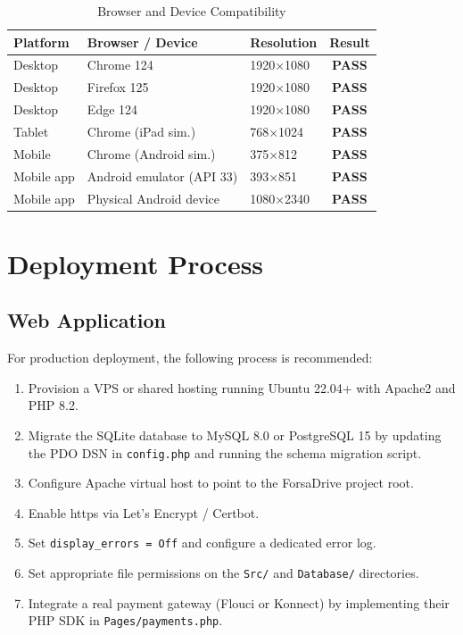 \documentclass[12pt,a4paper,openright]{report}
\begin{document}
\begin{table}[H]
\centering
\caption{Browser and Device Compatibility}
\label{tab:compat}
\begin{tabularx}{\textwidth}{l l l c}
\toprule
\textbf{Platform} & \textbf{Browser / Device} & \textbf{Resolution} & \textbf{Result} \\
\midrule
Desktop & Chrome 124 & 1920×1080 & \textcolor{green!70!black}{\textbf{PASS}} \\
Desktop & Firefox 125 & 1920×1080 & \textcolor{green!70!black}{\textbf{PASS}} \\
Desktop & Edge 124 & 1920×1080 & \textcolor{green!70!black}{\textbf{PASS}} \\
Tablet  & Chrome (iPad sim.) & 768×1024 & \textcolor{green!70!black}{\textbf{PASS}} \\
Mobile  & Chrome (Android sim.) & 375×812 & \textcolor{green!70!black}{\textbf{PASS}} \\
Mobile app & Android emulator (API 33) & 393×851 & \textcolor{green!70!black}{\textbf{PASS}} \\
Mobile app & Physical Android device & 1080×2340 & \textcolor{green!70!black}{\textbf{PASS}} \\
\bottomrule
\end{tabularx}
\end{table}

\section{Deployment Process}

\subsection{Web Application}

For production deployment, the following process is recommended:

\begin{enumerate}[noitemsep]
    \item Provision a VPS or shared hosting running Ubuntu 22.04+ with Apache2 and PHP 8.2.
    \item Migrate the SQLite database to MySQL 8.0 or PostgreSQL 15 by updating the PDO DSN in \texttt{config.php} and running the schema migration script.
    \item Configure Apache virtual host to point to the ForsaDrive project root.
    \item Enable \gls{https} via Let's Encrypt / Certbot.
    \item Set \texttt{display\_errors = Off} and configure a dedicated error log.
    \item Set appropriate file permissions on the \texttt{Src/} and \texttt{Database/} directories.
    \item Integrate a real payment gateway (Flouci or Konnect) by implementing their PHP SDK in \texttt{Pages/payments.php}.
\end{enumerate}
\end{document}
